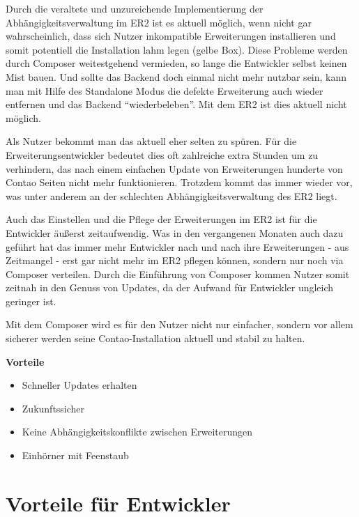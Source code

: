 \documentclass[
paper=a4,
draft=false,%
fontsize=10pt%
]{scrartcl}
\begin{document}
Durch die veraltete und unzureichende Implementierung der Abhängigkeitsverwaltung im ER2 ist es aktuell möglich, wenn nicht gar wahrscheinlich, dass sich Nutzer inkompatible Erweiterungen installieren und somit potentiell die Installation lahm legen (gelbe Box). Diese Probleme werden durch Composer weitestgehend vermieden, so lange die Entwickler selbst keinen Mist bauen. Und sollte das Backend doch einmal nicht mehr nutzbar sein, kann man mit Hilfe des Standalone Modus die defekte Erweiterung auch wieder entfernen und das Backend “wiederbeleben”. Mit dem ER2 ist dies aktuell nicht möglich.

Als Nutzer bekommt man das aktuell eher selten zu spüren. Für die Erweiterungsentwickler bedeutet dies oft zahlreiche extra Stunden um zu verhindern, das nach einem einfachen Update von Erweiterungen hunderte von Contao Seiten nicht mehr funktionieren. Trotzdem kommt das immer wieder vor, was unter anderem an der schlechten Abhängigkeitsverwaltung des ER2 liegt.

Auch das Einstellen und die Pflege der Erweiterungen im ER2 ist für die Entwickler äußerst zeitaufwendig. Was in den vergangenen Monaten auch dazu geführt hat das immer mehr Entwickler nach und nach ihre Erweiterungen - aus Zeitmangel - erst gar nicht mehr im ER2 pflegen können, sondern nur noch via Composer verteilen. Durch die Einführung von Composer kommen Nutzer somit zeitnah in den Genuss von Updates, da der Aufwand für Entwickler ungleich geringer ist.

Mit dem Composer wird es für den Nutzer nicht nur einfacher, sondern vor allem sicherer werden seine Contao-Installation aktuell und stabil zu halten.

\textbf{Vorteile}
\begin{itemize}
\item Schneller Updates erhalten
\item Zukunftssicher
\item Keine Abhängigkeitskonflikte zwischen Erweiterungen
\item Einhörner mit Feenstaub
\end{itemize}

%
%

\newpage

\section{Vorteile für Entwickler}
\end{document}
